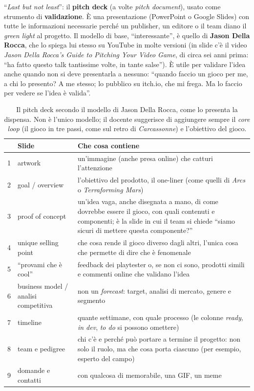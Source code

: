 ``\emph{Last but not least}'': il \textbf{pitch deck} (a volte \emph{pitch document}),
usato come strumento di \textbf{validazione}. È una presentazione (PowerPoint o Google
Slides) con tutte le informazioni necessarie perché un publisher, un editore o il team
diano il \emph{green light} al progetto. Il modello di base, ``interessante'', è quello di
\textbf{Jason Della Rocca}, che lo spiega lui stesso su YouTube in molte versioni (in slide
c'è il video \emph{Jason Della Rocca's Guide to Pitching Your Video Game}, di circa sei
anni prima: ``ha fatto questo talk tantissime volte, in tante salse''). È utile per
validare l'idea anche quando non si deve presentarla a nessuno: ``quando faccio un gioco
per me, a chi lo presento? A me stesso; lo pubblico su itch.io, che mi frega. Ma lo faccio
per vedere se l'idea è valida''.

\begin{table}[htbp]
\centering
\small
\begin{tabular}{@{}p{0.5cm}p{3.6cm}p{8.8cm}@{}}
\toprule
 & \textbf{Slide} & \textbf{Che cosa contiene} \\
\midrule
1 & artwork & un'immagine (anche presa online) che catturi l'attenzione \\
2 & goal / overview & l'obiettivo del prodotto, il one-liner (come quelli di \emph{Arcs} o
\emph{Terraforming Mars}) \\
3 & proof of concept & un'idea vaga, anche disegnata a mano, di come dovrebbe essere il
gioco, con quali contenuti e componenti; è la slide in cui il team si chiede ``siamo sicuri
di mettere questa componente?'' \\
4 & unique selling point & che cosa rende il gioco diverso dagli altri, l'unica cosa che
permette di dire che è fenomenale \\
5 & ``provami che è cool'' & feedback dei playtester o, se non ci sono, prodotti simili e
commenti online che validano l'idea \\
6 & business model / analisi competitiva & non un \emph{forecast}: target, analisi di
mercato, genere e segmento \\
7 & timeline & quante settimane, con quale processo (le colonne \emph{ready}, \emph{in
dev}, \emph{to do} si possono omettere) \\
8 & team e pedigree & chi c'è e perché può portare a termine il progetto: non solo il ruolo,
ma che cosa porta ciascuno (per esempio, esperto del campo) \\
9 & domande e contatti & con qualcosa di memorabile, una GIF, un meme \\
\bottomrule
\end{tabular}
\caption{Il pitch deck secondo il modello di Jason Della Rocca, come lo presenta la
dispensa. Non è l'unico modello; il docente suggerisce di aggiungere sempre il \emph{core
loop} (il gioco in tre passi, come sul retro di \emph{Carcassonne}) e l'obiettivo del
gioco.}
\label{a5:tab:pitch}
\end{table}

